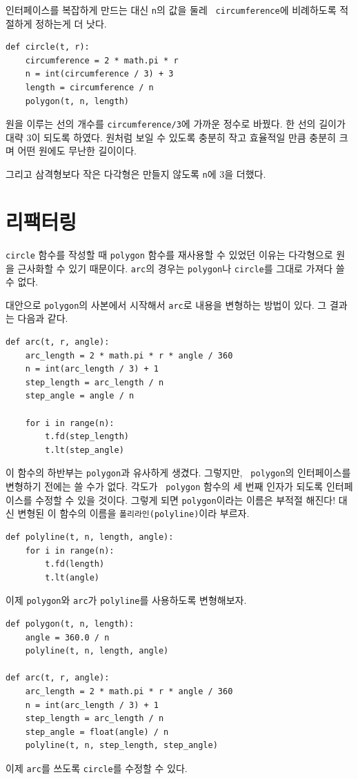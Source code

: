 \documentclass[10pt]{book}
\begin{document}
인터페이스를 복잡하게 만드는 대신 {\tt n}의 값을 둘레 {\tt
  circumference}에 비례하도록 적절하게 정하는게 더 낫다.



\begin{verbatim}
def circle(t, r):
    circumference = 2 * math.pi * r
    n = int(circumference / 3) + 3
    length = circumference / n
    polygon(t, n, length)
\end{verbatim}
%
원을 이루는 선의 개수를 {\tt circumference/3}에 가까운 정수로 바꿨다.
한 선의 길이가 대략 3이 되도록 하였다.  원처럼 보일 수 있도록 충분히
작고 효율적일 만큼 충분히 크며 어떤 원에도 무난한 길이이다.


그리고 삼격형보다 작은 다각형은 만들지 않도록 {\tt n}에 3을 더했다. 


\section{리팩터링}
\label{refactoring}

{\tt circle} 함수를 작성할 때 {\tt polygon} 함수를 재사용할 수 있었던
이유는 다각형으로 원을 근사화할 수 있기 때문이다.  {\tt arc}의 경우는
{\tt polygon}나 {\tt circle}를 그대로 가져다 쓸 수 없다.

대안으로 {\tt polygon}의 사본에서 시작해서 {\tt arc}로 내용을 변형하는
방법이 있다.  그 결과는 다음과 같다.

\begin{verbatim}
def arc(t, r, angle):
    arc_length = 2 * math.pi * r * angle / 360
    n = int(arc_length / 3) + 1
    step_length = arc_length / n
    step_angle = angle / n
    
    for i in range(n):
        t.fd(step_length)
        t.lt(step_angle)
\end{verbatim}
%
이 함수의 하반부는 {\tt polygon}과 유사하게 생겼다.  그렇지만, {\tt
  polygon}의 인터페이스를 변형하기 전에는 쓸 수가 없다.  각도가 {\tt
  polygon} 함수의 세 번째 인자가 되도록 인터페이스를 수정할 수 있을
것이다.  그렇게 되면 {\tt polygon}이라는 이름은 부적절 해진다!  대신
변형된 이 함수의 이름을 {\tt 폴리라인(polyline)}이라 부르자.

\begin{verbatim}
def polyline(t, n, length, angle):
    for i in range(n):
        t.fd(length)
        t.lt(angle)
\end{verbatim}
%
이제 {\tt polygon}와 {\tt arc}가 {\tt polyline}를 사용하도록 변형해보자.

\begin{verbatim}
def polygon(t, n, length):
    angle = 360.0 / n
    polyline(t, n, length, angle)

def arc(t, r, angle):
    arc_length = 2 * math.pi * r * angle / 360
    n = int(arc_length / 3) + 1
    step_length = arc_length / n
    step_angle = float(angle) / n
    polyline(t, n, step_length, step_angle)
\end{verbatim}
%
이제 {\tt arc}를 쓰도록 {\tt circle}를 수정할 수 있다. 
\end{document}
